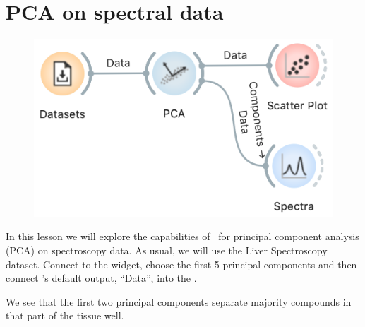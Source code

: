 \chapter{PCA on spectral data}
\label{ch:spectral-PCA}

\begin{figure}
    \includegraphics[scale=0.4]{graphics/ch-spectral_PCA/workflow1.png}
\end{figure}

In this lesson we will explore the capabilities of \mutation\ for principal component analysis (PCA) on spectroscopy data. As usual, we will use the Liver Spectroscopy dataset. Connect  to the  widget, choose the first 5 principal components and then connect 's default output, ``Data'', into the .

We see that the first two principal components separate majority compounds in that part of the tissue well.

